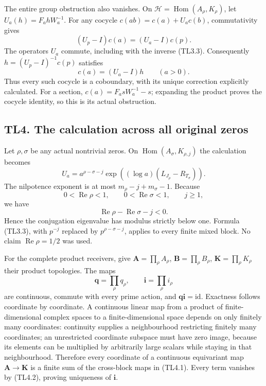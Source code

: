 The entire group obstruction also vanishes. On
\(\mathcal H=\operatorname{Hom}(A_\rho,K_\rho)\), let
\(U_a(h)=F_ahW_a^{-1}\). For any cocycle \(c(ab)=c(a)+U_ac(b)\),
commutativity gives \[
(U_p-I)c(a)=(U_a-I)c(p).
\] The operators \(U_a\) commute, including with the inverse (TL3.3).
Consequently \(h=(U_p-I)^{-1}c(p)\) satisfies \[
c(a)=(U_a-I)h\qquad(a>0).
\tag{TL3.6}
\] Thus every such cocycle is a coboundary, with its unique correction
explicitly calculated. For a section, \(c(a)=F_asW_a^{-1}-s\); expanding
the product proves the cocycle identity, so this is its actual
obstruction.

\subsection{TL4. The calculation across all original
zeros}\label{tl4.-the-calculation-across-all-original-zeros}

Let \(\rho,\sigma\) be any actual nontrivial zeros. On
\(\operatorname{Hom}(A_\sigma,K_{\rho,j})\) the calculation becomes \[
U_a=a^{\rho-\sigma-j}
\exp((\log a)(L_{J_\rho}-R_{T_\sigma})).
\tag{TL4.1}
\] The nilpotence exponent is at most \(m_\rho-j+m_\sigma-1\). Because
\[
0<\operatorname{Re}\rho<1,\qquad
0<\operatorname{Re}\sigma<1,\qquad j\ge1,
\] we have \[
\operatorname{Re}\rho-\operatorname{Re}\sigma-j<0.
\tag{TL4.2}
\] Hence the conjugation eigenvalue has modulus strictly below one.
Formula (TL3.3), with \(p^{-j}\) replaced by \(p^{\rho-\sigma-j}\),
applies to every finite mixed block. No claim
\(\operatorname{Re}\rho=1/2\) was used.

For the complete product receivers, give
\(\mathbf A=\prod_\rho A_\rho\), \(\mathbf B=\prod_\rho B_\rho\),
\(\mathbf K=\prod_\rho K_\rho\) their product topologies. The maps \[
\mathbf q=\prod_\rho q_\rho,\qquad
\mathbf i=\prod_\rho i_\rho
\] are continuous, commute with every prime action, and
\(\mathbf q\mathbf i=\mathrm{id}\). Exactness follows coordinate by
coordinate. A continuous linear map from a product of finite-dimensional
complex spaces to a finite-dimensional space depends on only finitely
many coordinates: continuity supplies a neighbourhood restricting
finitely many coordinates; an unrestricted coordinate subspace must have
zero image, because its elements can be multiplied by arbitrarily large
scalars while staying in that neighbourhood. Therefore every coordinate
of a continuous equivariant map \(\mathbf A\to\mathbf K\) is a finite
sum of the cross-block maps in (TL4.1). Every term vanishes by (TL4.2),
proving uniqueness of \(\mathbf i\).

